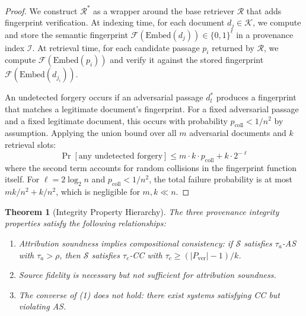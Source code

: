 \documentclass[journal,10pt]{IEEEtran}
\newtheorem{theorem}{Theorem}
\newcommand{\calR}{\mathcal{R}}
\newcommand{\calS}{\mathcal{S}}
\newcommand{\calF}{\mathcal{F}}
\newcommand{\calK}{\mathcal{K}}
\newcommand{\calI}{\mathcal{I}}
\begin{document}
\begin{proof}
We construct $\calR^*$ as a wrapper around the base retriever $\calR$ that adds fingerprint verification. At indexing time, for each document $d_j \in \calK$, we compute and store the semantic fingerprint $\calF(\text{Embed}(d_j)) \in \{0,1\}^\ell$ in a provenance index $\calI$. At retrieval time, for each candidate passage $p_i$ returned by $\calR$, we compute $\calF(\text{Embed}(p_i))$ and verify it against the stored fingerprint $\calF(\text{Embed}(d_{j_i}))$.

An undetected forgery occurs if an adversarial passage $d^*_l$ produces a fingerprint that matches a legitimate document's fingerprint. For a fixed adversarial passage and a fixed legitimate document, this occurs with probability $p_{\text{coll}} < 1/n^2$ by assumption. Applying the union bound over all $m$ adversarial documents and $k$ retrieval slots:
\begin{equation}
\Pr[\text{any undetected forgery}] \leq m \cdot k \cdot p_{\text{coll}} + k \cdot 2^{-\ell}
\end{equation}
where the second term accounts for random collisions in the fingerprint function itself. For $\ell = 2\log_2 n$ and $p_{\text{coll}} < 1/n^2$, the total failure probability is at most $mk/n^2 + k/n^2$, which is negligible for $m, k \ll n$.
\end{proof}

\begin{theorem}[Integrity Property Hierarchy]\label{thm:hierarchy}
The three provenance integrity properties satisfy the following relationships:
\begin{enumerate}
\item Attribution soundness implies compositional consistency: if $\calS$ satisfies $\tau_a$-AS with $\tau_a > \rho$, then $\calS$ satisfies $\tau_c$-CC with $\tau_c \geq (|P_{\text{ver}}| - 1)/k$.
\item Source fidelity is necessary but not sufficient for attribution soundness.
\item The converse of (1) does not hold: there exist systems satisfying CC but violating AS.
\end{enumerate}
\end{theorem}
\end{document}
